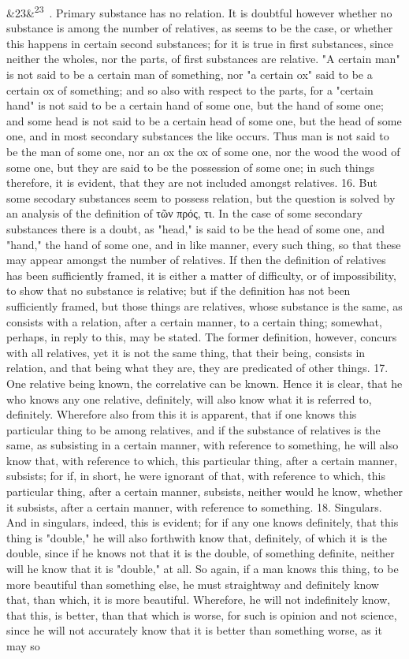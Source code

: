 \documentclass[12pt]{article}
\newcommand{\para}[1][]{\par\noindent\ifx&#1&\else\textsuperscript{\footnotesize #1}~\fi}
\begin{document}
\para[23] 15. Primary substance has no relation. It is doubtful however whether no substance is among the number of relatives, as seems to be the case, or whether this happens in certain second substances; for it is true in first substances, since neither the wholes, nor the parts, of first substances are relative. "A certain man" is not said to be a certain man of something, nor "a certain ox" said to be a certain ox of something; and so also with respect to the parts, for a "certain hand" is not said to be a certain hand of some one, but the hand of some one; and some head is not said to be a certain head of some one, but the head of some one, and in most secondary substances the like occurs. Thus man is not said to be the man of some one, nor an ox the ox of some one, nor the wood the wood of some one, but they are said to be the possession of some one; in such things therefore, it is evident, that they are not included amongst relatives. 16. But some secodary substances seem to possess relation, but the question is solved by an analysis of the definition of τῶν πρός, τι. In the case of some secondary substances there is a doubt, as "head," is said to be the head of some one, and "hand," the hand of some one, and in like manner, every such thing, so that these may appear amongst the number of relatives. If then the definition of relatives has been sufficiently framed, it is either a matter of difficulty, or of impossibility, to show that no substance is relative; but if the definition has not been sufficiently framed, but those things are relatives, whose substance is the same, as consists with a relation, after a certain manner, to a certain thing; somewhat, perhaps, in reply to this, may be stated. The former definition, however, concurs with all relatives, yet it is not the same thing, that their being, consists in relation, and that being what they are, they are predicated of other things. 17. One relative being known, the correlative can be known. Hence it is clear, that he who knows any one relative, definitely, will also know what it is referred to, definitely. Wherefore also from this it is apparent, that if one knows this particular thing to be among relatives, and if the substance of relatives is the same, as subsisting in a certain manner, with reference to something, he will also know that, with reference to which, this particular thing, after a certain manner, subsists; for if, in short, he were ignorant of that, with reference to which, this particular thing, after a certain manner, subsists, neither would he know, whether it subsists, after a certain manner, with reference to something. 18. Singulars. And in singulars, indeed, this is evident; for if any one knows definitely, that this thing is "double," he will also forthwith know that, definitely, of which it is the double, since if he knows not that it is the double, of something definite, neither will he know that it is "double," at all. So again, if a man knows this thing, to be more beautiful than something else, he must straightway and definitely know that, than which, it is more beautiful. Wherefore, he will not indefinitely know, that this, is better, than that which is worse, for such is opinion and not science, since he will not accurately know that it is better than something worse, as it may so 
\end{document}
